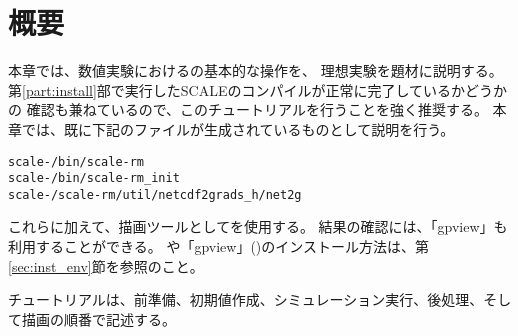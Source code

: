 \section{概要} \label{sec:ideal_exp_intro}

本章では、数値実験における{\scalerm}の基本的な操作を、
理想実験を題材に説明する。 
第\ref{part:install}部で実行したSCALEのコンパイルが正常に完了しているかどうかの
確認も兼ねているので、このチュートリアルを行うことを強く推奨する。
本章では、既に下記のファイルが生成されているものとして説明を行う。
\begin{alltt}
  scale-{\version}/bin/scale-rm
  scale-{\version}/bin/scale-rm_init
  scale-{\version}/scale-rm/util/netcdf2grads_h/net2g
\end{alltt}
これらに加えて、描画ツールとして\grads を使用する。
結果の確認には、「gpview」も利用することができる。
\grads や「gpview」(\gphys)のインストール方法は、第\ref{sec:inst_env}節を参照のこと。

チュートリアルは、前準備、初期値作成、シミュレーション実行、後処理、そして描画の順番で記述する。





